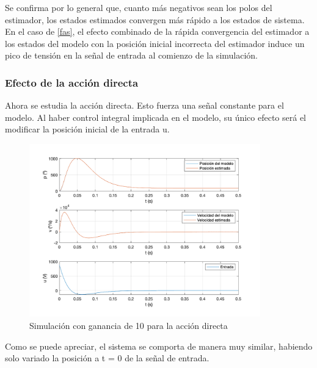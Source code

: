 \documentclass[a4paper, 12pt]{article}
\begin{document}
Se confirma por lo general que, cuanto más negativos sean los polos del estimador, los estados estimados convergen más rápido a los estados de sistema. En el caso de \ref{fas}, el efecto combinado de la rápida convergencia del estimador a los estados del modelo con la posición inicial incorrecta del estimador induce un pico de tensión en la señal de entrada al comienzo de la simulación. 

\subsubsection{Efecto de la acción directa}
Ahora se estudia la acción directa. Esto fuerza una señal constante para el modelo. Al haber control integral implicada en el modelo, su único efecto será el modificar la posición inicial de la entrada u. 

\begin{figure}[H]
	\centering
	\includegraphics*[height = 7.5cm]{figs/p4/ad10}

	\caption{Simulación con ganancia de 10 para la acción directa}
\end{figure}

Como se puede apreciar, el sistema se comporta de manera muy similar, habiendo solo variado la posición a t = 0 de la señal de entrada. 
\end{document}
